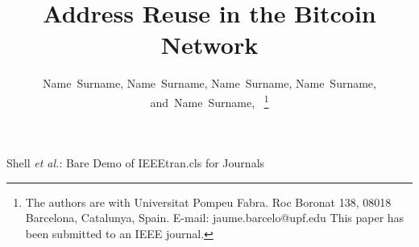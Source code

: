 \documentclass[journal]{IEEEtran}
\begin{document}
%
\title{Address Reuse in the Bitcoin Network}
%
%
%

\author{Name~Surname, %
        Name~Surname, %
        Name~Surname, 
        Name~Surname, %
        and~Name~Surname,~%
\thanks{The authors are with Universitat Pompeu Fabra.
Roc Boronat 138, 08018 Barcelona, Catalunya, Spain.
E-mail: jaume.barcelo@upf.edu
This paper has been submitted to an IEEE journal.
}
}

%
%



%
{Shell \MakeLowercase{\textit{et al.}}: Bare Demo of IEEEtran.cls for Journals}
%
\end{document}
